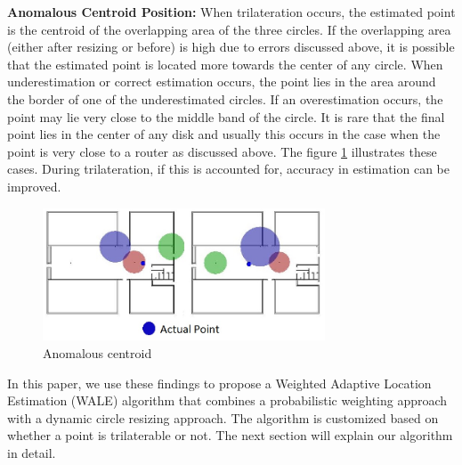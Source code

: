 \documentclass[twocolumn]{svjour3}
\begin{document}
\textbf{Anomalous Centroid Position:} When trilateration occurs, the estimated point is the centroid of the overlapping area of the three circles. If the overlapping area (either after resizing or before) is high due to errors discussed above, it is possible that the estimated point is located more towards the center of any circle. When underestimation or correct estimation occurs, the point lies in the area around the border of one of the underestimated circles. If an overestimation occurs, the point may lie very close to the middle band of the circle. It is rare that the final point lies in the center of any disk and usually this occurs in the case when the point is very close to a router as discussed above. The figure \ref{fig:collageofpoints1} illustrates these cases. During trilateration, if this is accounted for, accuracy in estimation can be improved.
\begin{figure}[t]
\centering
\includegraphics[width=84mm]{Skewed_Centroid.jpg}
\caption{Anomalous centroid }
\label{fig:collageofpoints1}
\end{figure}

In this paper, we use these findings to propose a Weighted Adaptive Location Estimation (WALE) algorithm that combines a probabilistic weighting approach with a dynamic circle resizing approach. The algorithm is customized based on whether a point is trilaterable or not. The next section will explain our algorithm in detail. 
\end{document}

